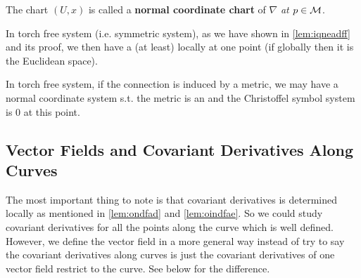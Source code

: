 \documentclass[12pt]{article} %
\begin{document}
\bter
    The chart $(U,x)$ is called a \textbf{normal coordinate chart} of $\nabla$ \textit{at $p\in\mathcal{M}$}.
\eter 
\begin{cora}
In torch free system (i.e. symmetric system), as we have shown in \cref{lem:iqneadff} and its proof, we then have a  (at least) locally at one point (if globally then it is the Euclidean space).
\end{cora}
\begin{rema}
In torch free system, if the connection is induced by a metric, we may have a normal coordinate system s.t. the metric is an   and the Christoffel symbol system is 0 at this point.
\end{rema}

\subsection{Vector Fields and Covariant Derivatives Along Curves}
The most important thing to note is that covariant derivatives is determined locally as mentioned in \cref{lem:ondfad} and \cref{lem:oindfae}. So we could study covariant derivatives for all the points along the curve which is well defined. However, we define the vector field in a more general way instead of try to say the covariant derivatives along curves is just the covariant derivatives of one vector field restrict to the curve. See below for the difference.
\end{document}
